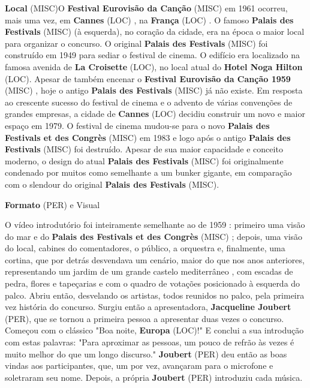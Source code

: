 \documentclass[12pt,a4paper]{article}
\begin{document}
\textbf{Local} (MISC)O \textbf{Festival Eurovisão da Canção} (MISC) em 1961 ocorreu, mais uma vez, em \textbf{Cannes} (LOC) , na \textbf{França} (LOC) . O famoso \textbf{Palais des Festivals} (MISC) (à esquerda), no coração da cidade, era na época o maior local para organizar o concurso. O original \textbf{Palais des Festivals} (MISC) foi construído em 1949 para sediar o festival de cinema. O edifício era localizado na famosa avenida de \textbf{La Croisette} (LOC), no local atual do \textbf{Hotel Noga Hilton} (LOC). Apesar de também encenar o \textbf{Festival Eurovisão da Canção 1959} (MISC) , hoje o antigo \textbf{Palais des Festivals} (MISC) já não existe. Em resposta ao crescente sucesso do festival de cinema e o advento de várias convenções de grandes empresas, a cidade de \textbf{Cannes} (LOC) decidiu construir um novo e maior espaço em 1979. O festival de cinema mudou-se para o novo \textbf{Palais des Festivals et des Congrès} (MISC) em 1983 e logo após o antigo \textbf{Palais des Festivals} (MISC) foi destruído. Apesar de sua maior capacidade e conceito moderno, o design do atual \textbf{Palais des Festivals} (MISC) foi originalmente condenado por muitos como semelhante a um bunker gigante, em comparação com o slendour do original \textbf{Palais des Festivals} (MISC).



\textbf{Formato} (PER) e Visual

O vídeo introdutório foi inteiramente semelhante ao de 1959 : primeiro uma visão do mar e do \textbf{Palais des Festivals et des Congrès} (MISC) ; depois, uma visão do local, cabines do comentadores, o público, a orquestra e, finalmente, uma cortina, que por detrás desvendava um cenário, maior do que nos anos anteriores, representando um jardim de um grande castelo mediterrâneo , com escadas de pedra, flores e tapeçarias e com o quadro de votações posicionado à esquerda do palco. Abriu então, desvelando os artistas, todos reunidos no palco, pela primeira vez história do concurso. Surgiu então a apresentadora, \textbf{Jacqueline Joubert} (PER), que se tornou a primeira pessoa a apresentar duas vezes o concurso. Começou com o clássico "Boa noite, \textbf{Europa} (LOC)!" E conclui a sua introdução com estas palavras: "Para aproximar as pessoas, um pouco de refrão às vezes é muito melhor do que um longo discurso." \textbf{Joubert} (PER) deu então as boas vindas aos participantes, que, um por vez, avançaram para o microfone e soletraram seu nome. Depois, a própria \textbf{Joubert} (PER) introduziu cada música.
\end{document}
